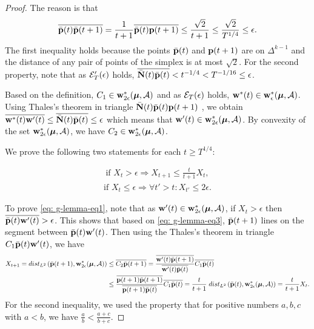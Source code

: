 \begin{proof}
        The reason is that 
        \begin{align*}
            \overline{\bar{\mathbf{p}}(t) \bar{\mathbf{p}}(t+1)} = \frac{1}{t+1} \overline{\bar{\mathbf{p}}(t) \mathbf{p}(t+1)} \leq \frac{\sqrt{2}}{t+1} \leq \frac{\sqrt{2}}{T^{1/4}} \leq \epsilon.  
        \end{align*}
        The first inequality holds because the points $\bar{\mathbf{p}}(t)$ and $\mathbf{p}(t+1)$ are on $\Delta^{k-1}$ and the distance of any pair of points of the simplex is at most $\sqrt{2}$. For the second property, note that as $\mathcal{E}'_T(\epsilon)$ holds, $\overline{\bar{\mathbf{N}}(t) \bar{\mathbf{p}}(t)} < t^{-1/4} < T^{-1/16} \leq \epsilon$.  
    
        Based on the definition, $C_1 \in \mathbf{w}^*_{2 \epsilon}(\boldsymbol{\mu}, \mathcal{A})$ and as $\mathcal{E}_T(\epsilon)$ holds, $\mathbf{w}^{*}(t) \in \mathbf{w}^*_{\epsilon}(\boldsymbol{\mu}, \mathcal{A})$. Using Thales's theorem in triangle $\bar{\mathbf{N}}(t) \bar{\mathbf{p}}(t) \mathbf{p}(t+1)$ , we obtain $\overline{\mathbf{w}^{*}(t) \mathbf{w}'(t)} \leq \overline{\bar{\mathbf{N}}(t) \bar{\mathbf{p}}(t)} \leq \epsilon$ which means that $\mathbf{w}'(t) \in \mathbf{w}^*_{2 \epsilon}(\boldsymbol{\mu}, \mathcal{A})$. By convexity of the set $\mathbf{w}^*_{2 \epsilon}(\boldsymbol{\mu}, \mathcal{A})$, we have $C_2 \in \mathbf{w}^*_{2 \epsilon}(\boldsymbol{\mu}, \mathcal{A})$. 
    
        We prove the following two statements for each $t \geq T^{1/4}$: 
        
        \begin{align}\label{eq: g-lemma-eq1}
            \text{if }  X_t > \epsilon \Longrightarrow X_{t+1} \leq \frac{t}{t+1} X_t, 
        \end{align}
        \begin{align} \label{eq: g-lemma-eq2}
            \text{if } X_t \leq \epsilon \Longrightarrow \forall t' > t: X_{t'} \leq 2 \epsilon. 
        \end{align} 
    
        To prove \eqref{eq: g-lemma-eq1}, note that as $\mathbf{w}'(t) \in \mathbf{w}^*_{2 \epsilon}(\boldsymbol{\mu}, \mathcal{A})$, if $X_t > \epsilon$ then $\overline{\bar{\mathbf{p}}(t) \mathbf{w}'(t)} > \epsilon$. This shows that based on \eqref{eq: g-lemma-eq3}, $\bar{\mathbf{p}}(t+1)$ lines on the segment between $\bar{\mathbf{p}}(t) \mathbf{w}'(t)$. Then using the Thales's theorem in triangle $C_1 \bar{\mathbf{p}}(t) \mathbf{w}'(t)$, we have 
        \begin{align*}
            X_{t+1} = dist_{L^2}\left(\bar{\mathbf{p}}(t+1), \mathbf{w}^*_{2 \epsilon}(\boldsymbol{\mu}, \mathcal{A})\right) &\leq \overline{C_2 \bar{\mathbf{p}}(t+1)} = \frac{\overline{\mathbf{w}'(t) \bar{\mathbf{p}}(t+1)}}{\overline{\mathbf{w}'(t) \bar{\mathbf{p}}(t)}} \overline{C_1 \bar{\mathbf{p}}(t)} \\
            &\leq \frac{\overline{\mathbf{p}(t+1) \bar{\mathbf{p}}(t+1)}}{\overline{\mathbf{p}(t+1) \bar{\mathbf{p}}(t)}} \overline{C_1 \bar{\mathbf{p}}(t)} = \frac{t}{t+1} \; dist_{L^2}\left(\bar{\mathbf{p}}(t), \mathbf{w}^*_{2 \epsilon}(\boldsymbol{\mu}, \mathcal{A})\right) = \frac{t}{t+1} X_t.
        \end{align*}
        For the second inequality, we used the property that for positive numbers $a,b,c$ with $a < b$, we have $\frac{a}{b} < \frac{a+c}{b+c}$.
    

\end{proof}
